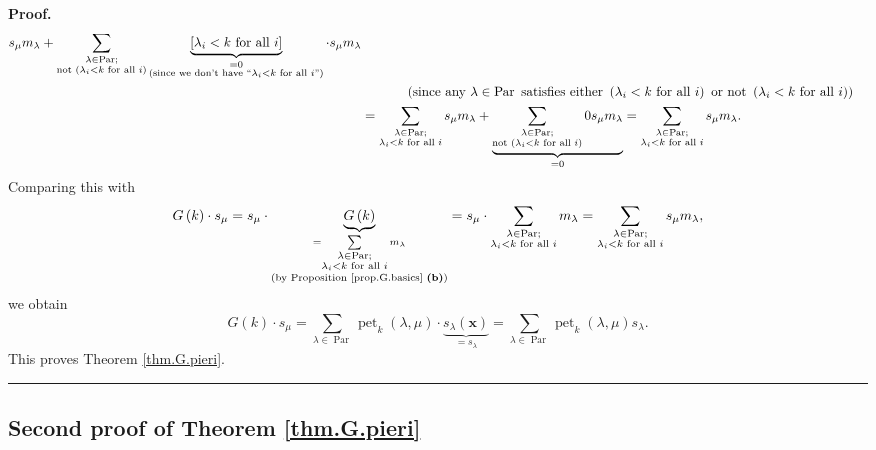 \documentclass[numbers=enddot,12pt,final,onecolumn,notitlepage]{scrartcl}%
\theoremstyle{definition}
\newenvironment{proof}[1][Proof]{\noindent\textbf{#1.} }{\ \rule{0.5em}{0.5em}}
\let\sumnonlimits\sum
\renewcommand{\sum}{\sumnonlimits\limits}
\begin{document}
\begin{proof}
\begin{align*}
s_{\mu}m_{\lambda}+\sum_{\substack{\lambda\in\operatorname*{Par};\\\text{not
}\left(  \lambda_{i}<k\text{ for all }i\right)  }}\underbrace{\left[
\lambda_{i}<k\text{ for all }i\right]  }_{\substack{=0\\\text{(since we don't
have \textquotedblleft}\lambda_{i}<k\text{ for all }i\text{\textquotedblright%
)}}}\cdot s_{\mu}m_{\lambda}\\
&  \ \ \ \ \ \ \ \ \ \ \left(  \text{since any }\lambda\in\operatorname*{Par}%
\text{ satisfies either }\left(  \lambda_{i}<k\text{ for all }i\right)  \text{
or not }\left(  \lambda_{i}<k\text{ for all }i\right)  \right) \\
&  =\sum_{\substack{\lambda\in\operatorname*{Par};\\\lambda_{i}<k\text{ for
all }i}}s_{\mu}m_{\lambda}+\underbrace{\sum_{\substack{\lambda\in
\operatorname*{Par};\\\text{not }\left(  \lambda_{i}<k\text{ for all
}i\right)  }}0s_{\mu}m_{\lambda}}_{=0}=\sum_{\substack{\lambda\in
\operatorname*{Par};\\\lambda_{i}<k\text{ for all }i}}s_{\mu}m_{\lambda}.
\end{align*}
Comparing this with%
\[
G\left(  k\right)  \cdot s_{\mu}=s_{\mu}\cdot\underbrace{G\left(  k\right)
}_{\substack{=\sum_{\substack{\lambda\in\operatorname*{Par};\\\lambda
_{i}<k\text{ for all }i}}m_{\lambda}\\\text{(by Proposition
\ref{prop.G.basics} \textbf{(b)})}}}=s_{\mu}\cdot\sum_{\substack{\lambda
\in\operatorname*{Par};\\\lambda_{i}<k\text{ for all }i}}m_{\lambda}%
=\sum_{\substack{\lambda\in\operatorname*{Par};\\\lambda_{i}<k\text{ for all
}i}}s_{\mu}m_{\lambda},
\]
we obtain
\[
G\left(  k\right)  \cdot s_{\mu}=\sum_{\lambda\in\operatorname*{Par}%
}\operatorname*{pet}\nolimits_{k}\left(  \lambda,\mu\right)  \cdot
\underbrace{s_{\lambda}\left(  \mathbf{x}\right)  }_{=s_{\lambda}}%
=\sum_{\lambda\in\operatorname*{Par}}\operatorname*{pet}\nolimits_{k}\left(
\lambda,\mu\right)  s_{\lambda}.
\]
This proves Theorem \ref{thm.G.pieri}.
\end{proof}

\subsection{\label{subsect.proofs.G.pieri.2nd}Second proof of Theorem
\ref{thm.G.pieri}}
\end{document}
